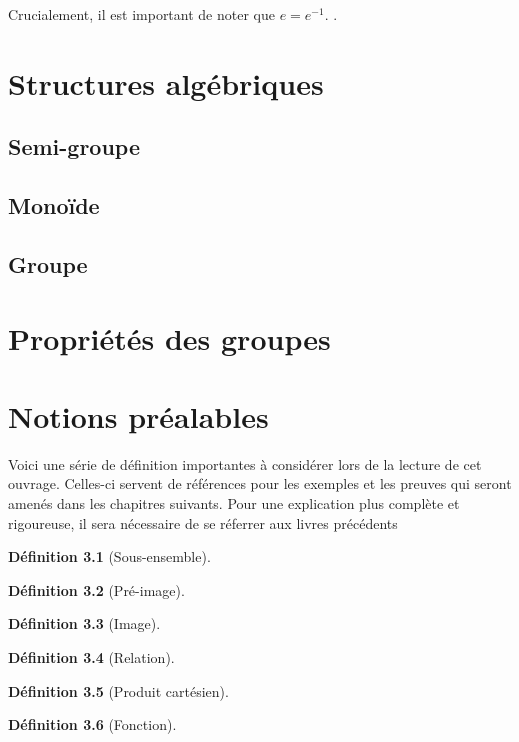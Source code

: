 \documentclass[12pt]{book}
\newcommand\todo[1]{\phantom{#1}}
\theoremstyle{definition}
\newtheorem{definition}{Définition}[section]
\begin{document}
Crucialement, il est important de noter que $e = e^{-1}$. \todo{Ajouter preuve}.

\chapter{Structures algébriques}

\section{Semi-groupe}
\section{Monoïde}
\section{Groupe}
\chapter{Propriétés des groupes}
\appendix
\chapter{Notions préalables}
Voici une série de définition importantes à considérer lors de la lecture de cet ouvrage. Celles-ci servent
de références pour les exemples et les preuves qui seront amenés dans les chapitres suivants. Pour une explication
plus complète et rigoureuse, il sera nécessaire de se réferrer aux livres précédents

\begin{definition}[Sous-ensemble]
    \label{def:sous_ensemble}
\end{definition}

\begin{definition}[Pré-image]
    \label{def:pre_image}
\end{definition}

\begin{definition}[Image]
    \label{def:image}
\end{definition}

\begin{definition}[Relation]
    \label{def:relation}
\end{definition}

\begin{definition}[Produit cartésien]
    \label{def:produit_cartesien}
\end{definition}

\begin{definition}[Fonction]
    \label{def:fonction}
\end{definition}
\end{document}
